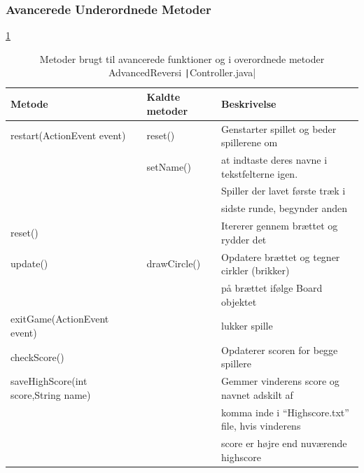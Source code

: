 \subsubsection{Avancerede Underordnede Metoder}
\cref{tbl:2}
\begin{table}[H]
    \centering
    \caption{Metoder brugt til avancerede funktioner og i overordnede metoder AdvancedReversi \texttt|Controller.java|}\label{tbl:2}
    \begin{tabular}{lll}
        \toprule
        Metode                               & Kaldte metoder  & Beskrivelse                                               \\
        \midrule
        restart(ActionEvent event)           & reset()         & Genstarter spillet og beder spillerene om                 \\
                                             & setName()       & at indtaste deres navne i tekstfelterne igen.             \\
                                             &                 & Spiller der lavet første træk i                           \\
                                             &                 & sidste runde, begynder anden                              \\
        reset()                              &                 & Itererer gennem brættet og rydder det                     \\
        update()                             & drawCircle()    & Opdatere brættet og tegner cirkler (brikker)              \\
                                             &                 & på brættet ifølge Board objektet                          \\
        exitGame(ActionEvent event)          &                 & lukker spille                                             \\
        checkScore()                         &                 & Opdaterer scoren for begge spillere                       \\
        saveHighScore(int score,String name) &                 & Gemmer vinderens score og navnet adskilt af               \\
                                             &                 & komma inde i ``Highscore.txt'' file, hvis vinderens       \\
                                             &                 & score er højre end nuværende highscore                    \\

\end{tabular}
\end{table}
